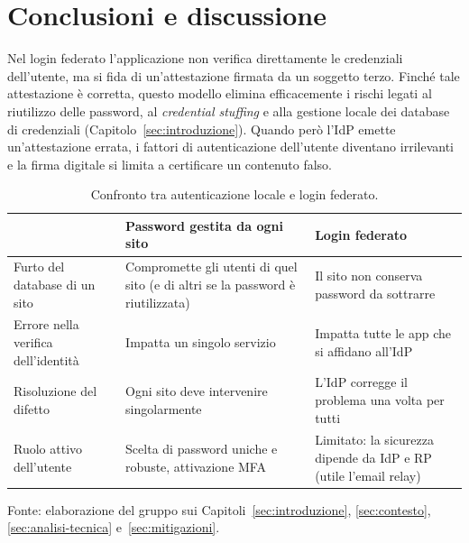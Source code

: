 \section{Conclusioni e discussione}
\label{sec:conclusioni}

Nel login federato l'applicazione non verifica direttamente le credenziali dell'utente, ma si fida di un'attestazione firmata da un soggetto terzo. Finché tale attestazione è corretta, questo modello elimina efficacemente i rischi legati al riutilizzo delle password, al \emph{credential stuffing} e alla gestione locale dei database di credenziali (Capitolo~\ref{sec:introduzione}). Quando però l'IdP emette un'attestazione errata, i fattori di autenticazione dell'utente diventano irrilevanti e la firma digitale si limita a certificare un contenuto falso.

\begin{table}[H]
    \centering
    \small
    \begin{tabular}{|p{}|p{}|p{}|}
        \hline
         & \textbf{Password gestita da ogni sito} & \textbf{Login federato} \\
        \hline
        Furto del database di un sito & Compromette gli utenti di quel sito (e di altri se la password è riutilizzata) & Il sito non conserva password da sottrarre \\
        \hline
        Errore nella verifica dell'identità & Impatta un singolo servizio & Impatta tutte le app che si affidano all'IdP \\
        \hline
        Risoluzione del difetto & Ogni sito deve intervenire singolarmente & L'IdP corregge il problema una volta per tutti \\
        \hline
        Ruolo attivo dell'utente & Scelta di password uniche e robuste, attivazione MFA & Limitato: la sicurezza dipende da IdP e RP (utile l'email relay) \\
        \hline
    \end{tabular}
    \caption{Confronto tra autenticazione locale e login federato.}
    {\footnotesize Fonte: elaborazione del gruppo sui Capitoli~\ref{sec:introduzione}, \ref{sec:contesto}, \ref{sec:analisi-tecnica} e~\ref{sec:mitigazioni}.\par}
    \label{tab:centralizzazione}
\end{table}

